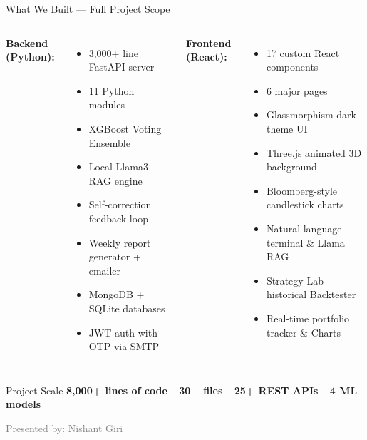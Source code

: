 \documentclass[aspectratio=169, 11pt]{beamer}
\begin{document}
\begin{frame}{What We Built --- Full Project Scope}
\begin{columns}[T]

\textbf{Backend (Python):}
\begin{itemize}
    \item 3,000+ line FastAPI server
    \item 11 Python modules
    \item XGBoost Voting Ensemble
    \item Local Llama3 RAG engine
    \item Self-correction feedback loop
    \item Weekly report generator + emailer
    \item MongoDB + SQLite databases
    \item JWT auth with OTP via SMTP
\end{itemize}


\textbf{Frontend (React):}
\begin{itemize}
    \item 17 custom React components
    \item 6 major pages
    \item Glassmorphism dark-theme UI
    \item Three.js animated 3D background
    \item Bloomberg-style candlestick charts
    \item Natural language terminal \& Llama RAG
    \item Strategy Lab historical Backtester
    \item Real-time portfolio tracker & Charts
\end{itemize}
\end{columns}

\vspace{0.3cm}
\begin{block}{Project Scale}
\centering
\textbf{8,000+ lines of code} \quad -- \quad \textbf{30+ files} \quad -- \quad \textbf{25+ REST APIs} \quad -- \quad \textbf{4 ML models}
\end{block}
\vfill
{\tiny\textcolor{gray}{Presented by: Nishant Giri}}
\end{frame}
\end{document}

